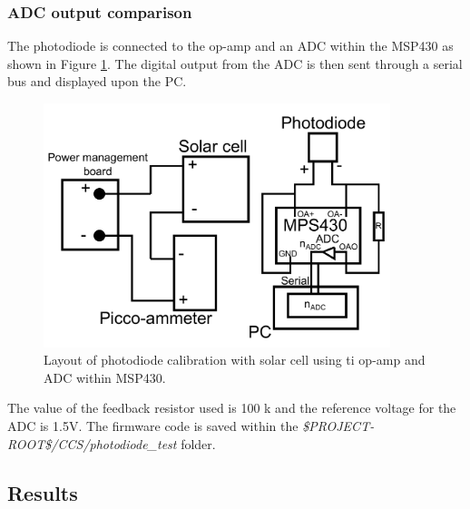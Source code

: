\documentclass[11pt]{article} %
\begin{document}
\subsubsection{ADC output comparison}
The photodiode is connected to the op-amp and an ADC within the  MSP430 as shown in Figure \ref{fig:photodiode_solar_cell_calibration_adc}.  The digital output from the ADC is then sent through a serial bus and displayed upon the PC.
\begin{figure}[htbp]
	\center
	\includegraphics[width = 0.9\textwidth]{../images/photodiode_solar_cell_calibration_adc.pdf}
	\caption{Layout of photodiode calibration with solar cell using ti op-amp and ADC within MSP430.}
	\label{fig:photodiode_solar_cell_calibration_adc}
\end{figure}
The value of the feedback resistor used is 100 k and the reference voltage for the ADC is 1.5V.  The firmware code is saved within the \emph{\$PROJECT-ROOT\$/CCS/photodiode\_test} folder.
\subsection{Results}
\end{document}
